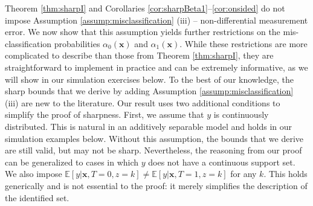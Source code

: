 Theorem \ref{thm:sharpI} and Corollaries \ref{cor:sharpBeta1}--\ref{cor:onsided} do not impose Assumption \ref{assump:misclassification} (iii) -- non-differential measurement error.
We now show that this assumption yields further restrictions on the mis-classification probabilities $\alpha_0(\mathbf{x})$ and $\alpha_1(\mathbf{x})$.
While these restrictions are more complicated to describe than those from Theorem \ref{thm:sharpI}, they are straightforward to implement in practice and can be extremely informative, as we will show in our simulation exercises below.
To the best of our knowledge, the sharp bounds that we derive by adding Assumption \ref{assump:misclassification} (iii) are new to the literature.
Our result uses two additional conditions to simplify the proof of sharpness.
First, we assume that $y$ is continuously distributed.
This is natural in an additively separable model and holds in our simulation examples below. 
Without this assumption, the bounds that we derive are still valid, but may not be sharp. 
Nevertheless, the reasoning from our proof can be generalized to cases in which $y$ does not have a continuous support set.
We also impose $\mathbb{E}[y|\mathbf{x},T = 0, z=k] \neq \mathbb{E}[y|\mathbf{x},T=1, z=k]$ for any $k$.
This holds generically and is not essential to the proof: it merely simplifies the description of the identified set.




